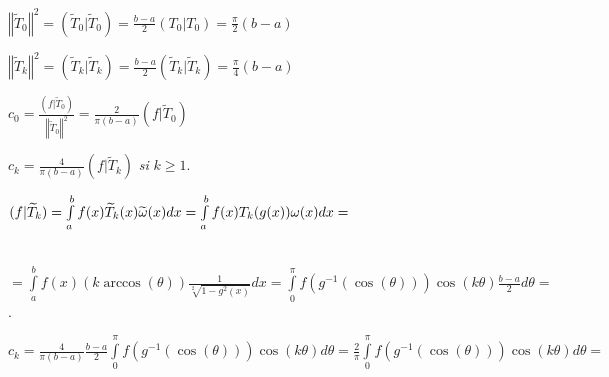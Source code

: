 \documentclass{article}
\begin{document}
$\left\Vert \widetilde{T}_{0}\right\Vert ^{2}=(\widetilde{T}_{0}|\widetilde{T%
}_{0})=\frac{b-a}{2}(T_{0}|T_{0})=\frac{\pi }{2}(b-a)$

$\left\Vert \widetilde{T}_{k}\right\Vert ^{2}=(\widetilde{T}_{k}|\widetilde{T%
}_{k})=\frac{b-a}{2}(\widetilde{T}_{k}|\widetilde{T}_{k})=\frac{\pi }{4}%
(b-a) $

$c_{0}=\frac{(f|\widetilde{T}_{0})}{\left\Vert \widetilde{T}_{0}\right\Vert
^{2}}=\frac{2}{\pi (b-a)}(f|\widetilde{T}_{0})$

$c_{k}=\frac{4}{\pi (b-a)}(f|\widetilde{T}_{k})$ \textit{si }$k\geq 1.$

$(f|\widetilde{T}_{k})=\int\limits_{a}^{b}f(x)\widetilde{T}_{k}(x)\widetilde{%
\omega }(x)dx=\int\limits_{a}^{b}f(x)T_{k}(g(x))\omega (x)dx=$

\ \ \ \ \ \ \ \ $=\int\limits_{a}^{b}f(x)(k\arccos (\theta ))\frac{1}{\sqrt[2%
]{1-g^{2}(x)}}dx=\int\limits_{0}^{\pi }f(g^{-1}(\cos (\theta )))\cos
(k\theta )\frac{b-a}{2}d\theta =$.

$c_{k}=\frac{4}{\pi (b-a)}\frac{b-a}{2}\int\limits_{0}^{\pi }f(g^{-1}(\cos
(\theta )))\cos (k\theta )d\theta =\frac{2}{\pi }\int\limits_{0}^{\pi
}f(g^{-1}(\cos (\theta )))\cos (k\theta )d\theta =$
\end{document}
